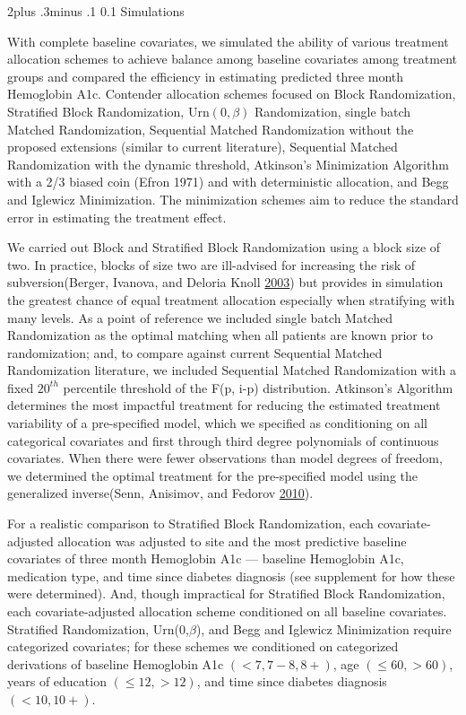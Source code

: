 \documentclass[12pt,oneside]{book}
\makeatletter
\newlength{\li}\setlength{\li}{14.48pt}
\newlength{\di}\setlength{\di}{-3.5mm}
\renewcommand\subsection{\@startsection {subsection}{2}{\z@}%
    {2\@bls  plus .3\@bls minus .1\@bls}%
    {0.1\@bls}%
    {\noindent\normalfont}}
\theoremstyle{definition}
\theoremstyle{definition}
\theoremstyle{definition}
\theoremstyle{remark}
\makeatother
\begin{document}
\hypertarget{simulations}{%
\subsection{Simulations}\label{simulations}}

With complete baseline covariates, we simulated the ability of various
treatment allocation schemes to achieve balance among baseline
covariates among treatment groups and compared the efficiency in
estimating predicted three month Hemoglobin A1c. Contender allocation
schemes focused on Block Randomization, Stratified Block Randomization,
Urn\((0,\beta)\) Randomization, single batch Matched Randomization,
Sequential Matched Randomization without the proposed extensions
(similar to current literature), Sequential Matched Randomization with
the dynamic threshold, Atkinson's Minimization Algorithm with a 2/3
biased coin (Efron 1971) and with deterministic allocation, and Begg and
Iglewicz Minimization. The minimization schemes aim to reduce the
standard error in estimating the treatment effect.

We carried out Block and Stratified Block Randomization using a block
size of two. In practice, blocks of size two are ill-advised for
increasing the risk of subversion(Berger, Ivanova, and Deloria Knoll
\protect\hyperlink{ref-Berger:2003im}{2003}) but provides in simulation
the greatest chance of equal treatment allocation especially when
stratifying with many levels. As a point of reference we included single
batch Matched Randomization as the optimal matching when all patients
are known prior to randomization; and, to compare against current
Sequential Matched Randomization literature, we included Sequential
Matched Randomization with a fixed \(20^{th}\) percentile threshold of
the F(p, i-p) distribution. Atkinson's Algorithm determines the most
impactful treatment for reducing the estimated treatment variability of
a pre-specified model, which we specified as conditioning on all
categorical covariates and first through third degree polynomials of
continuous covariates. When there were fewer observations than model
degrees of freedom, we determined the optimal treatment for the
pre-specified model using the generalized inverse(Senn, Anisimov, and
Fedorov \protect\hyperlink{ref-Senn:2010bg}{2010}).

For a realistic comparison to Stratified Block Randomization, each
covariate-adjusted allocation was adjusted to site and the most
predictive baseline covariates of three month Hemoglobin A1c ---
baseline Hemoglobin A1c, medication type, and time since diabetes
diagnosis (see supplement for how these were determined). And, though
impractical for Stratified Block Randomization, each covariate-adjusted
allocation scheme conditioned on all baseline covariates. Stratified
Randomization, Urn(0,\(\beta\)), and Begg and Iglewicz Minimization
require categorized covariates; for these schemes we conditioned on
categorized derivations of baseline Hemoglobin A1c \((<7, 7-8, 8+)\),
age \((\leq 60, >60)\), years of education \((\leq 12, >12)\), and time
since diabetes diagnosis \((<10, 10+)\).
\end{document}
